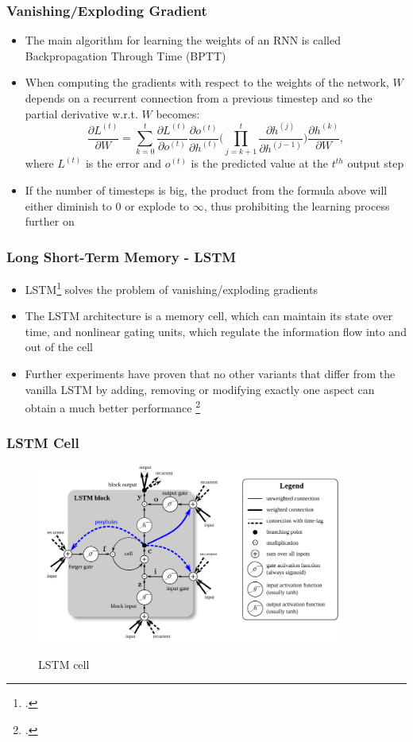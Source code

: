 \documentclass{beamer}
\begin{document}
\begin{frame}
\frametitle{Vanishing/Exploding Gradient}
\begin{itemize}
	\item The main algorithm for learning the weights of an RNN is called Backpropagation Through Time (BPTT)
	\item When computing the gradients with respect to the weights of the network, \(W\) depends on a recurrent connection from a previous timestep and so the partial derivative w.r.t. \(W\) becomes:
	\[
		\frac{\partial L^{(t)}}{\partial W} = \sum_{k=0}^{t} \frac{\partial L^{(t)}}{\partial o^{(t)}} \frac{\partial o^{(t)}}{\partial h^{(t)}} \bigg( \prod_{j=k+1}^t \frac{\partial h^{(j)}}{\partial h^{(j-1)}} \bigg) \frac{\partial h^{(k)}}{\partial W},
	\]
	where \(L^{(t)}\) is the error and \(o^{(t)}\) is the predicted value at the \(t^{th}\) output step
	\item If the number of timesteps is big, the product from the formula above will either diminish to \(0\) or explode to \(\infty\), thus prohibiting the learning process further on
\end{itemize}
\end{frame}

\begin{frame}
\frametitle{Long Short-Term Memory - LSTM}
\begin{itemize}
	\item LSTM\footcite{lstm} solves the problem of vanishing/exploding gradients
	\item The LSTM architecture is a memory cell, which can maintain its state over time, and nonlinear gating units, which regulate the information flow into and out of the cell
	\item Further experiments have proven that no other variants that differ from the vanilla LSTM by adding, removing or modifying exactly one aspect can obtain a much better performance \footcite{DBLP:journals/corr/GreffSKSS15}
\end{itemize}
\end{frame}

\begin{frame}
\frametitle{LSTM Cell}
\begin{figure}
        {\includegraphics[width=0.9\textwidth]{lstm_cell.png}}
        \caption{LSTM cell} 
    \end{figure}
\end{frame}
\end{document}
